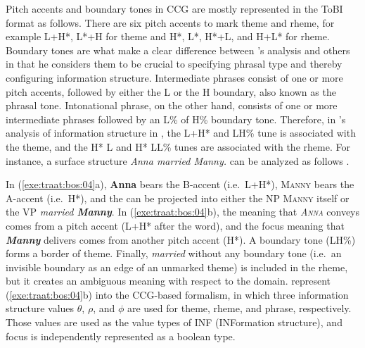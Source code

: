 Pitch accents and boundary tones in CCG are mostly represented in the
ToBI format as follows.  There are six pitch accents to mark theme and
rheme, for example L+H*, L*+H for theme and H*, L*, H*+L, and H+L* for
rheme. Boundary tones are what make a clear difference between
\citeauthor{steedman:00}'s analysis and others in that he considers
them to be crucial to specifying phrasal type and thereby configuring
information structure.  Intermediate phrases consist of one or more
pitch accents, followed by either the L or the H boundary, also known
as the phrasal tone. Intonational phrase, on the other hand, consists
of one or more intermediate phrases followed by an L\% of H\% boundary
tone. Therefore, in \citeauthor{steedman:00}'s analysis of information
structure in , the L+H* and LH\% tune is associated with
the theme, and the H* L and H* LL\% tunes are associated with the
rheme. For instance, a surface structure \textit{Anna married Manny.}
can be analyzed as follows \citep[302]{traat:bos:04}.





\noindent In (\ref{exe:traat:bos:04}a), \textbf{Anna} bears the
B-accent (i.e.\ L+H*), \textsc{Manny} bears the A-accent (i.e.\ H*),
and the  can be projected into either the NP \textsc{Manny}
itself or the VP \textit{married
  \textbf{Manny}}. In
(\ref{exe:traat:bos:04}b), the  meaning that
\textit{\textsc{Anna}} conveys comes from a pitch accent (L+H* after
the word), and the focus meaning that \textit{\textbf{Manny}} delivers
comes from another pitch accent (H*). A boundary tone (LH\%) forms a
border of theme. Finally, \textit{married} without any boundary tone
(i.e.\ an invisible boundary as an edge of an unmarked theme) is
included in the rheme, but it creates an ambiguous meaning with
respect to the  domain. \citet{traat:bos:04} represent
(\ref{exe:traat:bos:04}b) into the CCG-based formalism, in which three
information structure values \ensuremath{\theta}, \ensuremath{\rho},
and \ensuremath{\phi} are used for theme, rheme, and phrase,
respectively. Those values are used as the value types of INF
(INFormation structure), and focus is independently represented as a
boolean type.



